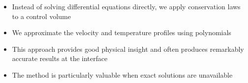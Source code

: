 \begin{itemize}
    \item Instead of solving differential equations directly, we apply conservation laws to a control volume
    \item We approximate the velocity and temperature profiles using polynomials
    \item This approach provides good physical insight and often produces remarkably accurate results at the interface
    \item The method is particularly valuable when exact solutions are unavailable
\end{itemize}






